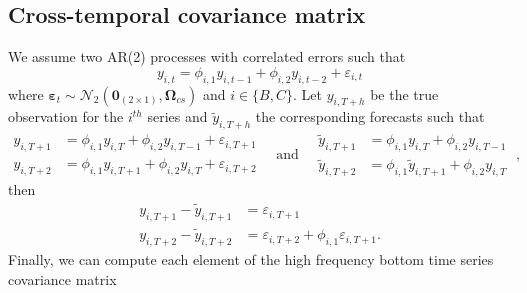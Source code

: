 \documentclass[a4paper,11pt]{article}
\newcommand{\epsvet}{\bm{\varepsilon}}
\newcommand{\Zerovet}{\bm{0}}
\newcommand{\Omegavet}{\bm{\Omega}}
\theoremstyle{definition}
\begin{document}
\subsection{Cross-temporal covariance matrix}\label{app:ar2}

We assume two AR(2) processes with correlated errors such that
$$
	y_{i,t} = \phi_{i,1}y_{i,t-1} + \phi_{i,2}y_{i,t-2} + \varepsilon_{i,t}
$$
where $\epsvet_t \sim \mathcal{N}_{2}\left(\Zerovet_{(2\times 1)}, \Omegavet_{cs}\right)$ and $i \in \{B, C\}$. Let $y_{i,T+h}$ be the true observation for the $i^{th}$ series and $\widetilde{y}_{i,T+h}$ the corresponding forecasts such that
$$
	\begin{array}{rl}
		y_{i,T+1} & = \phi_{i,1}y_{i,T} + \phi_{i,2}y_{i,T-1} + \varepsilon_{i,T+1} \\
		y_{i,T+2} & = \phi_{i,1}y_{i,T+1} + \phi_{i,2}y_{i,T} + \varepsilon_{i,T+2}
	\end{array}
	\quad\text{and}\quad
	\begin{array}{rl}
		\widetilde{y}_{i,T+1} & = \phi_{i,1}y_{i,T} + \phi_{i,2}y_{i,T-1}             \\
		\widetilde{y}_{i,T+2} & = \phi_{i,1}\widetilde{y}_{i,T+1} + \phi_{i,2}y_{i,T}
	\end{array}\;,
$$
then
\begin{align*}
	y_{i,T+1} - \widetilde{y}_{i,T+1} & = \varepsilon_{i,T+1}                                   \\
	y_{i,T+2} - \widetilde{y}_{i,T+2} & = \varepsilon_{i,T+2} + \phi_{i,1} \varepsilon_{i,T+1}.
\end{align*}
Finally, we can compute each element of the high frequency bottom time series covariance matrix
\end{document}
